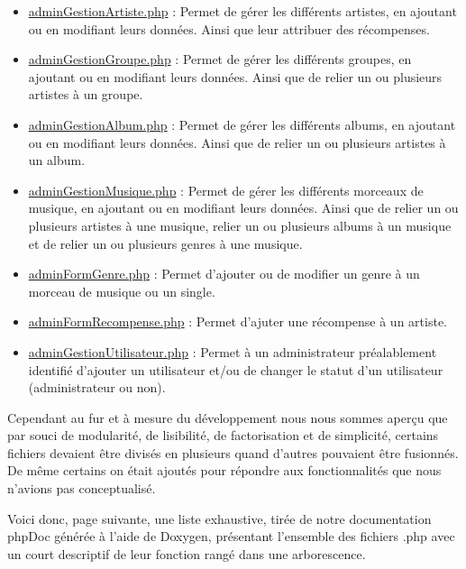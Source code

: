 \begin{paragraphe}
\begin{itemize}
        			\item \underline{adminGestionArtiste.php} : Permet de gérer les différents artistes, en ajoutant ou en modifiant leurs données. Ainsi que leur attribuer des récompenses.
        			\item \underline{adminGestionGroupe.php} : Permet de gérer les différents groupes, en ajoutant ou en modifiant leurs données. Ainsi que de relier un ou plusieurs artistes à un groupe.
        			\item \underline{adminGestionAlbum.php} : Permet de gérer les différents albums, en ajoutant ou en modifiant leurs données. Ainsi que de relier un ou plusieurs artistes à un album.
        			\item \underline{adminGestionMusique.php} : Permet de gérer les différents morceaux de musique, en ajoutant ou en modifiant leurs données. Ainsi que de relier un ou plusieurs artistes à une musique, relier un ou plusieurs albums à un musique et de relier un ou plusieurs genres à une musique.
        			\item \underline{adminFormGenre.php} : Permet d'ajouter ou de modifier un genre à un morceau de musique ou un single.
        			\item \underline{adminFormRecompense.php} : Permet d'ajuter une récompense à un artiste.
        			\item \underline{adminGestionUtilisateur.php} : Permet à un administrateur préalablement identifié d'ajouter un utilisateur et/ou de changer le statut d'un utilisateur (administrateur ou non).
        		\end{itemize}
        	\end{paragraphe}

        	\begin{paragraphe}
                Cependant au fur et à mesure du développement nous nous sommes aperçu que par souci de modularité, de lisibilité, de factorisation et de simplicité,
                certains fichiers devaient être divisés en plusieurs quand d'autres pouvaient être fusionnés.
                De même certains on était ajoutés pour répondre aux fonctionnalités que nous n'avions pas conceptualisé.
            \end{paragraphe}

            \begin{paragraphe}
                Voici donc, page suivante, une liste exhaustive, tirée de notre documentation phpDoc générée à l'aide de Doxygen, présentant l'ensemble des fichiers .php avec un court descriptif de leur
                fonction rangé dans une arborescence.
            \end{paragraphe}

